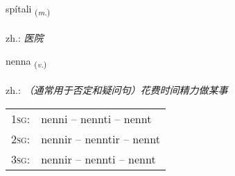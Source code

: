 \documentclass[frontgrid, backgrid]{flacards}\usepackage[]{graphicx}\usepackage[]{xcolor}
\begin{document}
\renewcommand{\blhead}{\vskip5pt {\small\bfseries\footnotesize Nafnorð | 名词 }}
\renewcommand{\bcfoot}{\vskip5pt \hspace{2pt}{\small\bfseries\footnotesize 3K}}


{spítali \small{\textsubscript{(\textit{m.})}} \\[1ex] %
\textphonetic{[spiːtalɪ]} \\
zh.: \emph{医院} \\  [2ex]
\renewcommand*{\arraystretch}{0.8}
}

\renewcommand{\flhead}{\vskip5pt \fboxsep=0pt {\small\bfseries\footnotesize Sagnorð | 动词}}
\renewcommand{\fcfoot}{\vskip5pt \fboxsep=0pt \hspace{2pt}{\small\bfseries\footnotesize 3K}}

\renewcommand{\blhead}{\vskip5pt {\small\bfseries\footnotesize Sagnorð | 动词 }}
\renewcommand{\bcfoot}{\vskip5pt \hspace{2pt}{\small\bfseries\footnotesize 3K}}


{nenna \small{\textsubscript{(\textit{v.})}} \\[1ex] %
\textphonetic{[nɛna]} \\
zh.: \emph{（通常用于否定和疑问句）花费时间精力做某事} \\  [2ex]
\renewcommand*{\arraystretch}{0.8}
\begin{tabular}{p{1cm}l}
\textsc{1sg}: & nenni -- nennti -- nennt \\ 
\textsc{2sg}: & nennir -- nenntir -- nennt \\ 
\textsc{3sg}: & nennir -- nennti -- nennt \\ 
\end{tabular}
}

\renewcommand{\flhead}{\vskip5pt \fboxsep=0pt {\small\bfseries\footnotesize Nafnorð | 名词}}
\renewcommand{\fcfoot}{\vskip5pt \fboxsep=0pt \hspace{2pt}{\small\bfseries\footnotesize 3K}}
\end{document}
